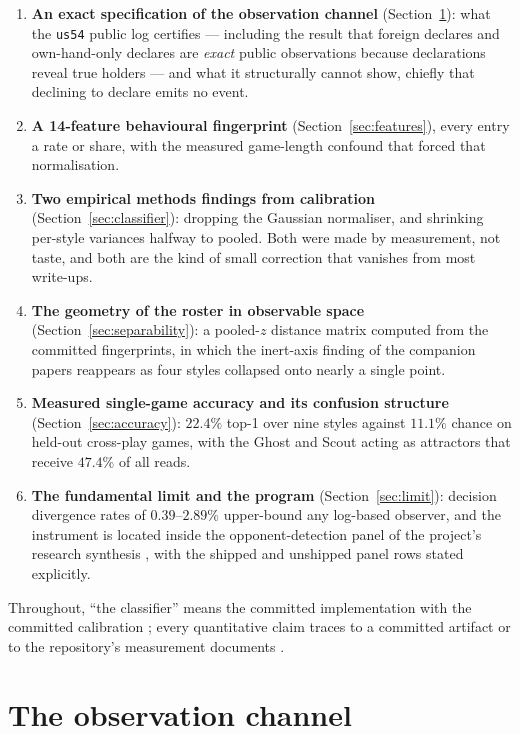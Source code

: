 \documentclass[11pt]{article}
\newcommand{\code}[1]{\texttt{#1}}
\newcommand{\usff}{\code{us54}}
\begin{document}
\begin{enumerate}
\item \textbf{An exact specification of the observation channel}
  (Section~\ref{sec:channel}): what the \usff{} public log certifies --- including the
  result that foreign declares and own-hand-only declares are \emph{exact} public
  observations because declarations reveal true holders --- and what it structurally cannot
  show, chiefly that declining to declare emits no event.
\item \textbf{A 14-feature behavioural fingerprint} (Section~\ref{sec:features}), every entry
  a rate or share, with the measured game-length confound that forced that normalisation.
\item \textbf{Two empirical methods findings from calibration}
  (Section~\ref{sec:classifier}): dropping the Gaussian normaliser, and shrinking per-style
  variances halfway to pooled. Both were made by measurement, not taste, and both are the
  kind of small correction that vanishes from most write-ups.
\item \textbf{The geometry of the roster in observable space}
  (Section~\ref{sec:separability}): a pooled-$z$ distance matrix computed from the committed
  fingerprints, in which the inert-axis finding of the companion papers
  \cite{inertpaper,v05} reappears as four styles collapsed onto nearly a single point.
\item \textbf{Measured single-game accuracy and its confusion structure}
  (Section~\ref{sec:accuracy}): $22.4\%$ top-1 over nine styles against $11.1\%$ chance on
  held-out cross-play games, with the Ghost and Scout acting as attractors that receive
  $47.4\%$ of all reads.
\item \textbf{The fundamental limit and the program} (Section~\ref{sec:limit}): decision
  divergence rates of $0.39$--$2.89\%$ \cite{styles,v05} upper-bound any log-based observer,
  and the instrument is located inside the opponent-detection panel of the project's research
  synthesis \cite{playstyles}, with the shipped and unshipped panel rows stated explicitly.
\end{enumerate}

Throughout, ``the classifier'' means the committed implementation with the committed
calibration \cite{fingerprints,repo}; every quantitative claim traces to a committed artifact
\cite{artifact,fingerprints} or to the repository's measurement documents \cite{rules,styles}.

\section{The observation channel}
\label{sec:channel}
\end{document}
